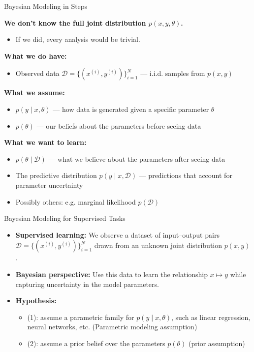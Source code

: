 \documentclass{beamer}
\begin{document}
\begin{frame}{Bayesian Modeling in Steps}

\textbf{We don’t know the full joint distribution $p(x, y, \theta)$.}
\begin{itemize}
  \item If we did, every analysis would be trivial.
\end{itemize}

\vspace{0.3cm}
\textbf{What we do have:}
\begin{itemize}
  \item Observed data $\mathcal{D} = \{(x^{(i)}, y^{(i)})\}_{i=1}^N$ — i.i.d. samples from $p(x, y)$
\end{itemize}

\vspace{0.3cm}
\textbf{What we assume:}
\begin{itemize}
  \item $p(y \mid x, \theta)$ — how data is generated given a specific parameter $\theta$
  \item $p(\theta)$ — our beliefs about the parameters before seeing data
\end{itemize}

\vspace{0.3cm}
\textbf{What we want to learn:}
\begin{itemize}
  \item $p(\theta \mid \mathcal{D})$ — what we believe about the parameters after seeing data
  \item The predictive distribution $p(y \mid x, \mathcal{D})$ — predictions that account for parameter uncertainty
  \item Possibly others: e.g. marginal likelihood $p(\mathcal{D})$
\end{itemize}

\end{frame}

\begin{frame}{Bayesian Modeling for Supervised Tasks}

  \begin{itemize}
    \item \textbf{Supervised learning:} We observe a dataset of input–output pairs
    $\mathcal{D} = \{(x^{(i)}, y^{(i)})\}_{i=1}^N$ drawn from an unknown joint distribution $p(x, y)$.

    \item \textbf{Bayesian perspective:} Use this data to learn the relationship $x \mapsto y$ while capturing uncertainty in the model parameters.

    \item \textbf{Hypothesis:}
      \begin{itemize}
        \item (1): assume a parametric family for $p(y \mid x, \theta)$, such as linear regression, neural networks, etc. (Parametric modeling assumption)
        \item (2): assume a prior belief over the parameters $p(\theta)$ (prior assumption)
        \end{itemize}
    \end{itemize}
  \end{frame}
\end{document}

